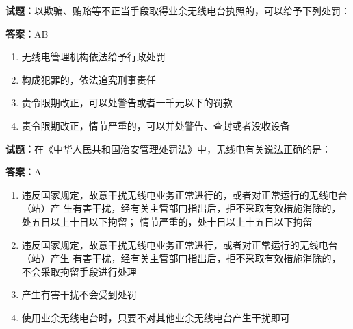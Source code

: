 \documentclass{ctexbook}
\begin{document}





\vspace{1em}

\textbf{试题：}以欺骗、贿赂等不正当手段取得业余无线电台执照的，可以给予下列处罚： 

\textbf{答案：}AB 

\begin{enumerate}[leftmargin=3em]
  \item 无线电管理机构依法给予行政处罚 

  \item 构成犯罪的，依法追究刑事责任 

  \item 责令限期改正，可以处警告或者一千元以下的罚款 

  \item 责令限期改正，情节严重的，可以并处警告、查封或者没收设备 

\end{enumerate}





\vspace{1em}

\textbf{试题：}在《中华人民共和国治安管理处罚法》中，无线电有关说法正确的是： 

\textbf{答案：}A 

\begin{enumerate}[leftmargin=3em]
  \item 违反国家规定，故意干扰无线电业务正常进行的，或者对正常运行的无线电台（站）产
生有害干扰，经有关主管部门指出后，拒不采取有效措施消除的，处五日以上十日以下拘留；
情节严重的，处十日以上十五日以下拘留 

  \item 违反国家规定，故意干扰无线电业务正常进行，或者对正常运行的无线电台（站）产生
有害干扰，经有关主管部门指出后，拒不采取有效措施消除的，不会采取拘留手段进行处理 

  \item 产生有害干扰不会受到处罚 

  \item 使用业余无线电台时，只要不对其他业余无线电台产生干扰即可 

\end{enumerate}


\end{document}
